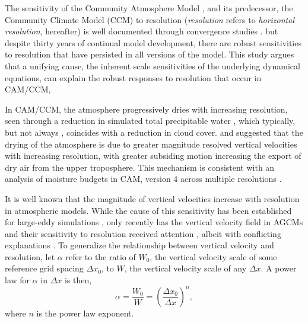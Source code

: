 \documentclass[times]{qjrms4}
\begin{document}
The sensitivity of the Community Atmosphere Model \citep[CAM;][]{CAM5}, and its predecessor, the Community Climate Model (CCM) to resolution ({\em{resolution}} refers to {\em{horizontal resolution}}, hereafter) is well documented through convergence studies \citep{KW1991JGR,WETAL1995CD,W2008TELLUS,RETAL2013JCLIM,ZetAl2014JCb,HR2017JCLIM}. {\color{red}{CAM/CCM is a well supported climate model,}} but despite thirty years of continual model development, there are robust sensitivities to resolution that have persisted in all versions of the model. This study argues that a unifying cause, the inherent scale sensitivities of the underlying dynamical equations, can explain the robust responses to resolution that occur in CAM/CCM, {\color{red}{since it is difficult to conceive that inevitable responses to native grid resolution could be ignored in the pursuit of scale-aware physics.}}

In CAM/CCM, the atmosphere progressively dries with increasing resolution, seen through a reduction in simulated total precipitable water \citep{KW1991JGR,WETAL1995CD,W2008TELLUS,RETAL2013JCLIM,ZetAl2014JCb,HR2017JCLIM}, which typically, but not always \citep[see][]{WETAL1995CD,ZetAl2014JCb}, coincides with a reduction in cloud cover. \cite{KW1991JGR} and \cite{WETAL1995CD} suggested that the drying of the atmosphere is due to greater magnitude resolved vertical velocities with increasing resolution, with greater subsiding motion increasing the export of dry air from the upper troposphere. This mechanism is consistent with an analysis of moisture budgets in CAM, version 4 \citep[CAM4;][]{CAM4} across multiple resolutions \citep{YETAL2014JCLIM,HR2017JCLIM}.

It is well known that the magnitude of vertical velocities increase with resolution in atmospheric models. While the cause of this sensitivity has been established for large-eddy simulations \citep[see][and references therein]{J2017JAMES}, only recently has the vertical velocity field in AGCMs and their sensitivity to resolution received attention \citep{DETALA2016ACP,OETAL2016JAMES}, albeit with conflicting explanations \citep{RETAL2016CD,HR2018JAMES}. To generalize the relationship between vertical velocity and resolution, let $\alpha$ refer to the ratio of $W_0$, the vertical velocity scale of some reference grid spacing $\Delta x_0$, to $W$, the vertical velocity scale of any $\Delta x$. A power law for $\alpha$ in $\Delta x$ is then,
\begin{equation}
\alpha = \frac{W_0}{W} = \left( \frac{\Delta x_0}{\Delta x} \right)^n, \label{eq:alpha}
\end{equation}
where $n$ is the power law exponent. 
\end{document}
